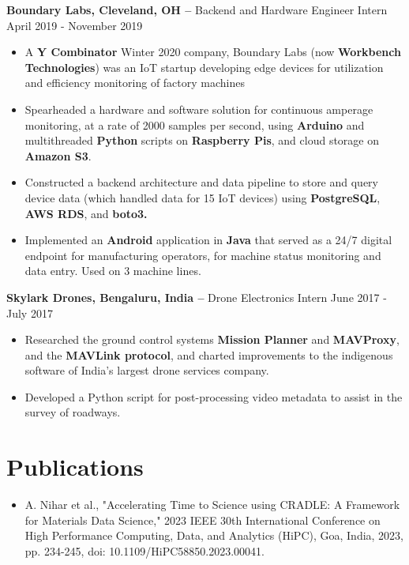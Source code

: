 \documentclass{res}
\begin{document}
\begin{resume}
 {\large{\bf Boundary Labs, Cleveland, OH –} Backend and Hardware Engineer Intern  \hfill April  2019 - November 2019 }
 \begin{itemize} \itemsep -2pt  %
 \item A \textbf{Y Combinator} Winter 2020 company, Boundary Labs (now \textbf{Workbench Technologies}) was an IoT startup developing edge devices for utilization and efficiency monitoring of factory machines 
 \item Spearheaded a hardware and software solution for continuous amperage monitoring, at a rate of 2000 samples per second, using \textbf{Arduino} and multithreaded \textbf{Python} scripts on \textbf{Raspberry Pis}, and cloud storage on \textbf{Amazon S3}.
 \item Constructed a backend architecture and data pipeline to store and query device data (which  handled data for 15 IoT devices) using \textbf{PostgreSQL}, \textbf{AWS RDS}, and  \textbf{boto3.} 
 \item Implemented an \textbf{Android} application in \textbf{Java} that served as a 24/7 digital endpoint for manufacturing operators, for machine status monitoring and data entry. Used on 3 machine lines.
 \end{itemize}

{\large{\bf Skylark Drones, Bengaluru, India –} Drone Electronics Intern  \hfill  June 2017 - July 2017}
\begin{itemize} \itemsep -2pt %
	\item Researched  the ground control systems \textbf{Mission Planner} and \textbf{MAVProxy}, and the \textbf{MAVLink protocol}, and charted improvements to the indigenous software of India's largest drone services company.
	\item Developed a Python script for post-processing video metadata to assist in the survey of roadways.
\end{itemize}

\section{Publications}
\begin{itemize}
	\item A. Nihar et al., "Accelerating Time to Science using CRADLE: A Framework for Materials Data Science," 2023 IEEE 30th International Conference on High Performance Computing, Data, and Analytics (HiPC), Goa, India, 2023, pp. 234-245, doi: 10.1109/HiPC58850.2023.00041.
	

\end{itemize}
\end{resume}
\end{document}

